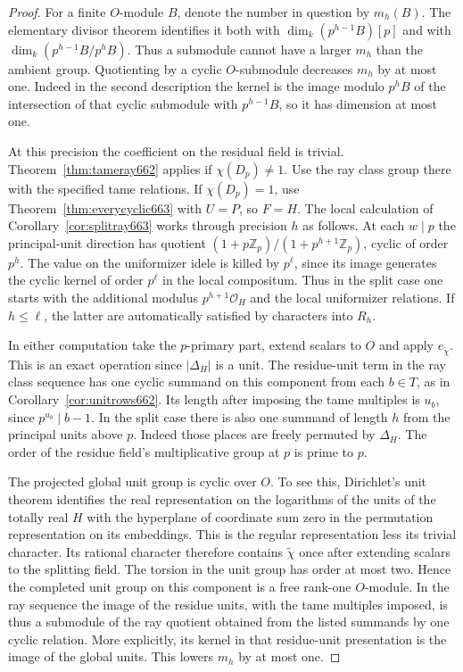 \documentclass[a4paper,11pt]{article}
\theoremstyle{definition}
\theoremstyle{remark}
\newcommand{\ZZ}{\mathbb Z}\newcommand{\ord}{\operatorname{ord}}
\numberwithin{equation}{section}
\begin{document}
\begin{proof}
For a finite \(O\)-module \(B\), denote the number in question by
\(m_h(B)\). The elementary divisor theorem identifies it both
with \(\dim_k (p^{h-1}B)[p]\) and with
\(\dim_k(p^{h-1}B/p^hB)\). Thus a submodule cannot have a
larger \(m_h\) than the ambient group. Quotienting by a cyclic
\(O\)-submodule decreases \(m_h\) by at most one. Indeed in
the second description the kernel is the image modulo \(p^h B\)
of the intersection of that cyclic submodule with
\(p^{h-1}B\), so it has dimension at most one.

At this precision the coefficient on the residual field is
trivial. Theorem~\ref{thm:tameray662} applies if \(\chi(D_p)\ne1\).
Use the ray class group there with the specified tame relations.
If \(\chi(D_p)=1\), use Theorem~\ref{thm:everycyclic663} with
\(U=P\), so \(F=H\). The local calculation of
Corollary~\ref{cor:splitray663} works through precision \(h\)
as follows. At each \(w\mid p\) the principal-unit direction
has quotient \((1+p\ZZ_p)/(1+p^{h+1}\ZZ_p)\), cyclic of order
\(p^h\). The value on the uniformizer idele is killed by
\(p^\ell\), since its image generates the cyclic kernel of
order \(p^\ell\) in the local compositum. Thus in the split
case one starts with the additional modulus
\(p^{h+1}\mathcal O_H\) and the local uniformizer relations.
If \(h\le\ell\), the latter are automatically satisfied by
characters into \(R_h\).

In either computation take the \(p\)-primary part, extend
scalars to \(O\) and apply \(e_{\widetilde\chi}\).
This is an exact operation since \(|\Delta_H|\) is a unit.
The residue-unit term in the ray class sequence has one
cyclic summand on this component from each \(b\in T\), as
in Corollary~\ref{cor:unitrows662}. Its length after imposing
the tame multiples is \(u_b\), since
\(p^{u_b}\mid b-1\). In the split case there is also one
summand of length \(h\) from the principal units above \(p\).
Indeed those places are freely permuted by \(\Delta_H\).
The order of the residue field's multiplicative group at \(p\)
is prime to \(p\).

The projected global unit group is cyclic over \(O\).
To see this, Dirichlet's unit theorem identifies the real
representation on the logarithms of the units of the totally
real \(H\) with the hyperplane of coordinate sum zero in the
permutation representation on its embeddings. This is the regular
representation less its trivial character. Its rational character
therefore contains \(\widetilde\chi\) once after extending
scalars to the splitting field. The torsion in the unit group has order at most two. Hence the
completed unit group on this component is a free rank-one
\(O\)-module. In the ray sequence
the image of the residue units, with the tame multiples imposed,
is thus a submodule of the ray quotient obtained from the
listed summands by one cyclic relation. More explicitly, its
kernel in that residue-unit presentation is the image of
the global units. This lowers \(m_h\) by at most one.


\end{proof}
\end{document}
